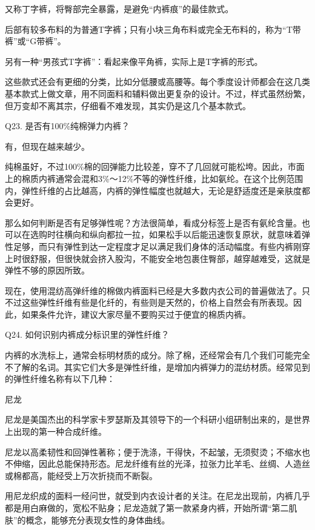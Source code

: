 \documentclass[12pt,UTF8]{ctexbook}
\begin{document}
又称丁字裤，将臀部完全暴露，是避免“内裤痕”的最佳款式。

后部有较多布料的为普通T字裤；只有小块三角布料或完全无布料的，称为“T带裤”或“G带裤”。

另有一种“男孩式T字裤”：看起来像平角裤，实际上是T字裤的形式。


这些款式还会有更细的分类，比如分低腰或高腰等。每个季度设计师都会在这几类基本款式上做文章，用不同面料和辅料做出更复杂的设计。不过，样式虽然纷繁，但万变却不离其宗，仔细看不难发现，其实仍是这几个基本款式。





Q23. 是否有100\%纯棉弹力内裤？


有，但现在越来越少。

纯棉虽好，不过100\%棉的回弹能力比较差，穿不了几回就可能松垮。因此，市面上的棉质内裤通常会混和3\%～12\%不等的弹性纤维，比如氨纶。在这个比例范围内，弹性纤维的占比越高，内裤的弹性幅度也就越大，无论是舒适度还是亲肤度都会更好。

那么如何判断是否有足够弹性呢？方法很简单，看成分标签上是否有氨纶含量。也可以在选购时往横向和纵向都拉一拉，如果松手以后能迅速恢复原状，就意味着弹性足够，而只有弹性到达一定程度才足以满足我们身体的活动幅度。有些内裤刚穿上时很舒服，但很快就会挤入股沟，不能安全地包裹住臀部，越穿越难受，这就是弹性不够的原因所致。

现在，使用混纺高弹纤维的棉做内裤面料已经是大多数内衣公司的普遍做法了。只不过这些弹性纤维有些是化纤的，有些则是天然的，价格上自然会有所表现。因此，如果条件允许，建议大家尽量不要购买过于便宜的棉质内裤。





Q24. 如何识别内裤成分标识里的弹性纤维？


内裤的水洗标上，通常会标明材质的成分。除了棉，还经常会有几个我们可能完全不了解的名词。其实它们大多是弹性纤维，是增加内裤弹力的混纺材质。经常见到的弹性纤维名称有以下几种：

尼龙

尼龙是美国杰出的科学家卡罗瑟斯及其领导下的一个科研小组研制出来的，是世界上出现的第一种合成纤维。

尼龙以高柔韧性和回弹性著称；便于洗涤，干得快，不起皱，无须熨烫；不缩水也不伸缩，因此总能保持形态。尼龙纤维有丝的光泽，拉张力比羊毛、丝绸、人造丝或棉都高，能经受上万次折挠而不断裂。

用尼龙织成的面料一经问世，就受到内衣设计者的关注。在尼龙出现前，内裤几乎都是用白麻做的，宽松不贴身；尼龙造就了第一款紧身内裤，开始所谓“第二肌肤”的概念，能够充分表现女性的身体曲线。
\end{document}
